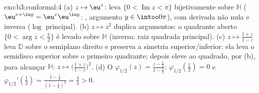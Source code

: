 \begin{solution}{exo:b3:conformal:4}
(a) $z \mapsto \eu^z$: leva $\{0 < \operatorname{Im}z <
\pi\}$ bijetivamente sobre $\mathbb H$ ($\eu^{x+\iu y} =
\eu^x\eu^{\iu y}$: , argumento $y \in
\intoo0\pi$),  com derivada não nula e
inversa  ($\log$ principal).
(b) $z \mapsto z^2$ duplica argumentos: o quadrante aberto
$\{0 < \arg z < \frac\pi2\}$ é levado  sobre $\mathbb
H$ (inversa: raiz quadrada principal).
(c) $z \mapsto \frac{1 + z}{1 - z}$ leva $\mathbb D$ sobre o
semiplano direito e preserva a simetria superior/inferior: ela
leva o semidisco superior sobre o primeiro quadrante; depois
eleve ao quadrado, por (b), para alcançar $\mathbb H$: $z \mapsto \bigl(\frac{1
+ z}{1 - z}\bigr)^2$.
(d) O  $\varphi_{1/2}(z) = \frac{z -
\frac12}{1 - \frac z2}$: $\varphi_{1/2}(\tfrac12) = 0$ e
$\varphi_{1/2}'(\tfrac12) = \frac{1 - \frac14}{(1 -
\frac14)^2} = \frac43 > 0$.
\end{solution}

